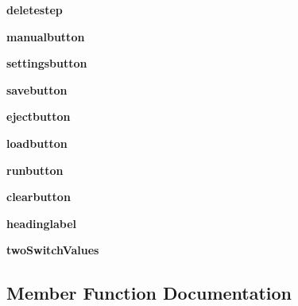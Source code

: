\begin{DoxyCompactItemize}
\mbox{\label{class_g_u_i_1_1_automatic_page_acc20273f8fd92babaf57d29c2b0991b2}} 
{\bfseries deletestep}
\item 
\mbox{\label{class_g_u_i_1_1_automatic_page_aff952e2bcc5816103234663ff5da64e4}} 
{\bfseries manualbutton}
\item 
\mbox{\label{class_g_u_i_1_1_automatic_page_ad59c8360368b61cf90f5a54bdaddb50a}} 
{\bfseries settingsbutton}
\item 
\mbox{\label{class_g_u_i_1_1_automatic_page_a9ee7f4dda48ab61dedd110ea61b2744d}} 
{\bfseries savebutton}
\item 
\mbox{\label{class_g_u_i_1_1_automatic_page_a32f3b0400f864da0c90bbdfaf8e0e390}} 
{\bfseries ejectbutton}
\item 
\mbox{\label{class_g_u_i_1_1_automatic_page_a3297d85f64a126dba509432342a2bbc9}} 
{\bfseries loadbutton}
\item 
\mbox{\label{class_g_u_i_1_1_automatic_page_a76ba2775f70508457cf1cbf7bdb0266c}} 
{\bfseries runbutton}
\item 
\mbox{\label{class_g_u_i_1_1_automatic_page_a109a256191c222788fd6facb59168a46}} 
{\bfseries clearbutton}
\item 
\mbox{\label{class_g_u_i_1_1_automatic_page_a80516e311ba938b07b48efc49cb04b44}} 
{\bfseries headinglabel}
\item 
\mbox{\label{class_g_u_i_1_1_automatic_page_a1f890c197f0c5fbb621bc850eff774ca}} 
{\bfseries two\+Switch\+Values}
\end{DoxyCompactItemize}


\subsection{Member Function Documentation}
\mbox{\label{class_g_u_i_1_1_automatic_page_aea693cdbd377db97bbc87460227c504e}} 
